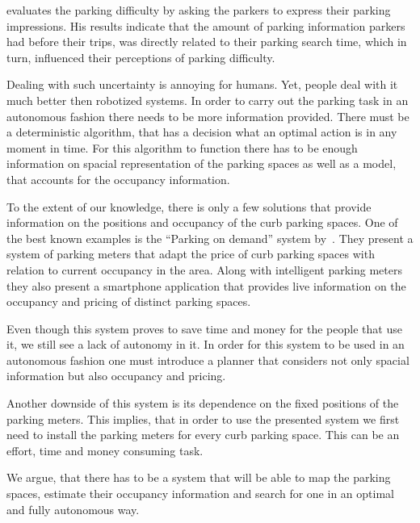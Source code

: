 \citet{rodrigue2013geography} evaluates the parking difficulty by asking the
parkers to express their parking impressions. His results indicate that the
amount of parking information parkers had before their trips, was directly
related to their parking search time, which in turn, influenced their
perceptions of parking difficulty.

Dealing with such uncertainty is annoying for humans. Yet, people deal with it
much better then robotized systems. In order to carry out the parking task in
an autonomous fashion there needs to be more information provided. There must
be a deterministic algorithm, that has a decision what an optimal action is in
any moment in time. For this algorithm to function there has to be enough
information on spacial representation of the parking spaces as well as a
model, that accounts for the occupancy information.

To the extent of our knowledge, there is only a few solutions that provide
information on the positions and occupancy of the curb parking spaces. One of
the best known examples is the ``Parking on demand'' system
by~\citet{sfo,sfo2}. They present a system of parking meters that adapt the
price of curb parking spaces with relation to current occupancy in the area.
Along with intelligent parking meters they also present a smartphone
application that provides live information on the occupancy and pricing of
distinct parking spaces.

Even though this system proves to save time and money for the people that use
it, we still see a lack of autonomy in it. In order for this system to be used
in an autonomous fashion one must introduce a planner that considers not only
spacial information but also occupancy and pricing.

Another downside of this system is its dependence on the fixed positions of
the parking meters. This implies, that in order to use the presented system we
first need to install the parking meters for every curb parking space. This
can be an effort, time and money consuming task.

We argue, that there has to be a system that will be able to map the parking
spaces, estimate their occupancy information and search for one in an optimal
and fully autonomous way.

